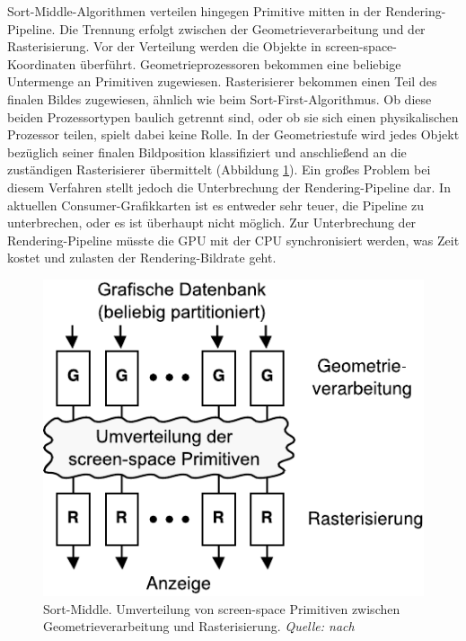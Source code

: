 Sort-Middle-Algorithmen verteilen hingegen Primitive mitten in der Rendering-Pipeline. Die Trennung erfolgt zwischen der Geometrieverarbeitung und der Rasterisierung. Vor der Verteilung werden die Objekte in screen-space-Koordinaten überführt. Geometrieprozessoren bekommen eine beliebige Untermenge an Primitiven zugewiesen. Rasterisierer bekommen einen Teil des finalen Bildes zugewiesen, ähnlich wie beim Sort-First-Algorithmus. Ob diese beiden Prozessortypen baulich getrennt sind, oder ob sie sich einen physikalischen Prozessor teilen, spielt dabei keine Rolle. In der Geometriestufe wird jedes Objekt bezüglich seiner finalen Bildposition klassifiziert und anschließend an die zuständigen Rasterisierer übermittelt (Abbildung \ref{fig:relwork:sortmiddle}). Ein großes Problem bei diesem Verfahren stellt jedoch die Unterbrechung der Rendering-Pipeline dar. In aktuellen Consumer-Grafikkarten ist es entweder sehr teuer, die Pipeline zu unterbrechen, oder es ist überhaupt nicht möglich. Zur Unterbrechung der Rendering-Pipeline müsste die GPU mit der CPU synchronisiert werden, was Zeit kostet und zulasten der Rendering-Bildrate geht.
\begin{figure}
 \centering
  \includegraphics[scale=0.8]{images/sort-middle.pdf}
  \caption{Sort-Middle. Umverteilung von screen-space Primitiven zwischen Geometrieverarbeitung und Rasterisierung. \textit{Quelle: nach \cite{molnar}}}
 \label{fig:relwork:sortmiddle}
\end{figure}

